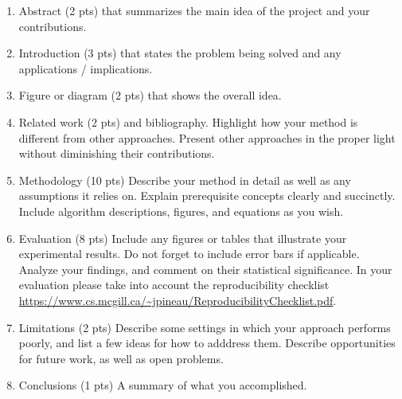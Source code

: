 \documentclass[a4paper,10pt]{article}
\begin{document}
\begin{enumerate}
 \item Abstract (2 pts) that summarizes the main idea of the project and your contributions.
 \item Introduction (3 pts) that states the problem being solved and any applications / implications.
 \item Figure or diagram (2 pts) that shows the overall idea. 
 \item Related work (2 pts) and bibliography. Highlight how your method is different from other approaches. Present other approaches in the proper light without diminishing their contributions.
 \item Methodology (10 pts) Describe your method in detail as well as any assumptions it relies on. Explain prerequisite concepts clearly and succinctly. Include algorithm descriptions, figures, and equations 
       as you wish.  
 \item Evaluation (8 pts) Include any figures or tables that illustrate your experimental results. Do not forget to include error bars if applicable. Analyze your findings, and comment on their 
 statistical significance. In your evaluation please take into account the reproducibility checklist \url{https://www.cs.mcgill.ca/~jpineau/ReproducibilityChecklist.pdf}.  
 \item Limitations (2 pts) Describe some settings in which your approach performs poorly, and list a few ideas for how to adddress them. Describe opportunities for future work, as well as open problems.
 \item Conclusions (1 pts) A summary of what you accomplished.
\end{enumerate}
\end{document}
